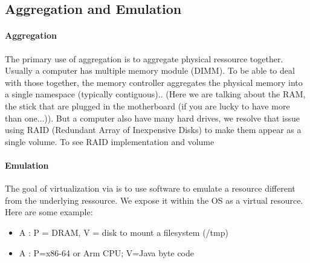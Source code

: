 \documentclass[a4paper]{book}
\begin{document}
\subsection{Aggregation and Emulation}
\paragraph{Aggregation}%
\label{par:Aggregation}
The primary use of aggregation is to aggregate physical ressource together. Usually a computer has multiple memory module (DIMM). To be able to deal with those together, the memory controller aggregates the physical memory into a single namespace (typically contiguous).. (Here we are talking about the RAM, the stick that are plugged in the motherboard (if you are lucky to have more than one...)). But a computer also have many hard drives, we resolve that issue using RAID (Redundant Array of Inexpensive Disks) to make them appear as a single volume.
To see RAID implementation and volume

\paragraph{Emulation}%
\label{par:Emulation}
The goal of virtualization via  is to use software to emulate a resource different from the underlying ressource. We expose it within the OS as a virtual resource. Here are some example:
\begin{itemize}
    \item A : P = DRAM, V = disk to mount a filesystem (/tmp)
    \item A : P=x86-64 or Arm CPU; V=Java byte code
\end{itemize}
\end{document}

